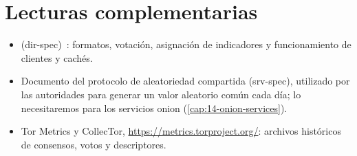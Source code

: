 \section*{Lecturas complementarias}
\begin{itemize}
  \item {} (dir-spec)~\cite{torspec}: formatos, votación, asignación de indicadores y funcionamiento de clientes y cachés.
  \item Documento del protocolo de aleatoriedad compartida (srv-spec), utilizado por las autoridades para generar un valor aleatorio común cada día; lo necesitaremos para los servicios onion (\cref{cap:14-onion-services}).
  \item Tor Metrics y CollecTor, \url{https://metrics.torproject.org/}: archivos históricos de consensos, votos y descriptores.
\end{itemize}

